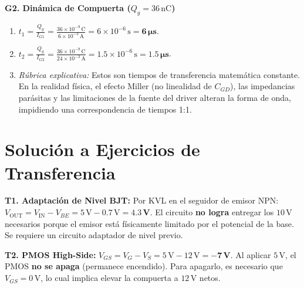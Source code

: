 \documentclass[11pt, a4paper]{article}
\begin{document}
\textbf{G2. Dinámica de Compuerta ($Q_g = 36\,\text{nC}$)}
\begin{enumerate}[label=\alph*)]
    \item $t_1 = \frac{Q_g}{I_{G1}} = \frac{36 \times 10^{-9}\,\text{C}}{6 \times 10^{-3}\,\text{A}} = 6 \times 10^{-6}\,\text{s} = \mathbf{6\,\mu\text{s}}$.
    \item $t_2 = \frac{Q_g}{I_{G2}} = \frac{36 \times 10^{-9}\,\text{C}}{24 \times 10^{-3}\,\text{A}} = 1.5 \times 10^{-6}\,\text{s} = \mathbf{1.5\,\mu\text{s}}$.
    \item \textit{Rúbrica explicativa:} Estos son tiempos de transferencia matemática constante. En la realidad física, el efecto Miller (no linealidad de $C_{GD}$), las impedancias parásitas y las limitaciones de la fuente del driver alteran la forma de onda, impidiendo una correspondencia de tiempos 1:1.
\end{enumerate}

\section*{Solución a Ejercicios de Transferencia}

\textbf{T1. Adaptación de Nivel BJT:}
Por KVL en el seguidor de emisor NPN: $V_{\text{OUT}} = V_{\text{IN}} - V_{BE} = 5\,\text{V} - 0.7\,\text{V} = \mathbf{4.3\,\text{V}}$.
El circuito \textbf{no logra} entregar los $10\,\text{V}$ necesarios porque el emisor está físicamente limitado por el potencial de la base. Se requiere un circuito adaptador de nivel previo.

\textbf{T2. PMOS High-Side:}
$V_{GS} = V_G - V_S = 5\,\text{V} - 12\,\text{V} = \mathbf{-7\,\text{V}}$.
Al aplicar $5\,\text{V}$, el PMOS \textbf{no se apaga} (permanece encendido). Para apagarlo, es necesario que $V_{GS} = 0\,\text{V}$, lo cual implica elevar la compuerta a $12\,\text{V}$ netos.
\end{document}
